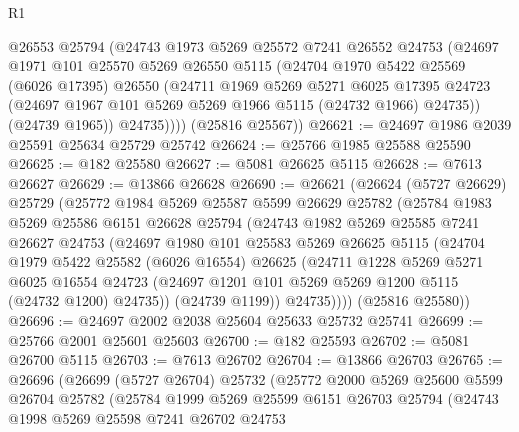 \begin{lexlean}{R1}
\begin{coremodule}
          @26553
          @25794
          (@24743
            @1973
            @5269
            @25572
            @7241
            @26552
            @24753
            (@24697
              @1971
              @101
              @25570
              @5269
              @26550
              @5115
              (@24704
                @1970
                @5422
                @25569
                (@6026 @17395)
                @26550
                (@24711
                  @1969
                  @5269
                  @5271
                  @6025
                  @17395
                  @24723
                  (@24697 @1967 @101 @5269 @5269 @1966 @5115 (@24732 @1966) @24735))
                (@24739 @1965))
              @24735))))
      (@25816 @25567))
@26621 := @24697 @1986 @2039 @25591 @25634 @25729 @25742
@26624 := @25766 @1985 @25588 @25590
@26625 := @182 @25580
@26627 := @5081 @26625 @5115
@26628 := @7613 @26627
@26629 := @13866 @26628
@26690 := @26621
    (@26624
      (@5727 @26629)
      @25729
      (@25772
        @1984
        @5269
        @25587
        @5599
        @26629
        @25782
        (@25784
          @1983
          @5269
          @25586
          @6151
          @26628
          @25794
          (@24743
            @1982
            @5269
            @25585
            @7241
            @26627
            @24753
            (@24697
              @1980
              @101
              @25583
              @5269
              @26625
              @5115
              (@24704
                @1979
                @5422
                @25582
                (@6026 @16554)
                @26625
                (@24711
                  @1228
                  @5269
                  @5271
                  @6025
                  @16554
                  @24723
                  (@24697 @1201 @101 @5269 @5269 @1200 @5115 (@24732 @1200) @24735))
                (@24739 @1199))
              @24735))))
      (@25816 @25580))
@26696 := @24697 @2002 @2038 @25604 @25633 @25732 @25741
@26699 := @25766 @2001 @25601 @25603
@26700 := @182 @25593
@26702 := @5081 @26700 @5115
@26703 := @7613 @26702
@26704 := @13866 @26703
@26765 := @26696
    (@26699
      (@5727 @26704)
      @25732
      (@25772
        @2000
        @5269
        @25600
        @5599
        @26704
        @25782
        (@25784
          @1999
          @5269
          @25599
          @6151
          @26703
          @25794
          (@24743
            @1998
            @5269
            @25598
            @7241
            @26702
            @24753

\end{coremodule}
\end{lexlean}
